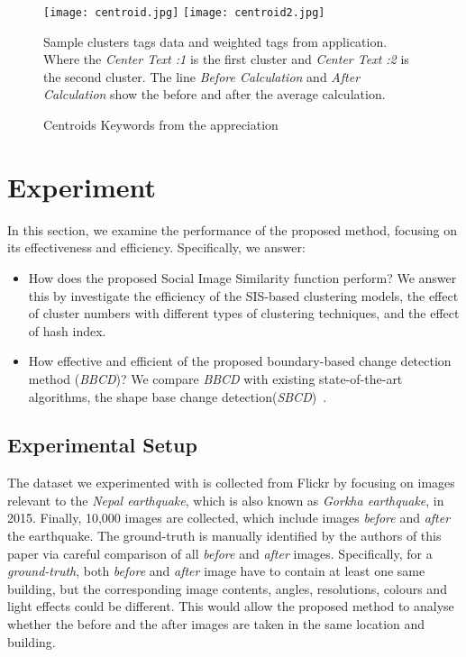 \documentclass[runningheads,a4paper]{llncs}
\begin{document}
{\begin{figure}[h]
	\centering
	\texttt{[image: centroid.jpg]}
	\texttt{[image: centroid2.jpg]}
	\caption{Centroids Keywords from the appreciation}
	{\footnotesize Sample clusters tags data and weighted tags from application. Where the \textit{Center Text :1} is the first cluster and \textit{Center Text :2} is the second cluster. The line \textit{Before Calculation} and \textit{After Calculation} show the before and after the average calculation.}
\end{figure}

\pagebreak
}
\section{Experiment} \label{sec-evaluation}
In this section, we examine the performance of the proposed method, focusing on its effectiveness and efficiency. 
Specifically, we answer:
\begin{itemize}
\item How does the proposed Social Image Similarity function perform? 
We answer this by investigate the efficiency of the SIS-based clustering models,
the effect of cluster numbers with different types of clustering techniques,
and the effect of hash index. 
\item How effective and efficient of the proposed boundary-based change detection method (\emph{BBCD})?
We compare \emph{BBCD} with existing state-of-the-art algorithms, the shape base change detection(\textit{SBCD})~\cite{rs2051217}. 
\end{itemize}
\subsection{Experimental Setup}
The dataset we experimented with is collected from Flickr by focusing on images relevant to the \textit{Nepal earthquake}, which is also known as \textit{Gorkha earthquake}, in 2015.
Finally, 10,000 images are collected, which include images \emph{before} and \emph{after} the earthquake. 
The ground-truth is manually identified by the authors of this paper via careful comparison of all \emph{before} and \emph{after} images. 
Specifically, for a \emph{ground-truth}, both \emph{before} and \emph{after} image have to contain at least one same building, but the corresponding image contents, angles, resolutions, colours and light effects could be different. 
This would allow the proposed method to analyse whether the before and the after images are taken in the same location and building. 
\end{document}
